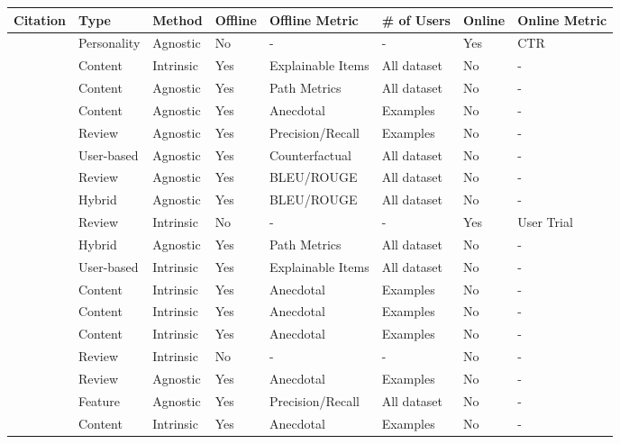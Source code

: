 \begin{tabular}{llllllll}
\toprule
Citation & Type & Method & Offline & Offline Metric & # of Users & Online & Online Metric \\
\midrule
\cite{takami_flanagan_dai_ogata_2023} & Personality & Agnostic & No & - & - & Yes & CTR \\
\cite{lin_zhang_lin_zeng_zhou_wu_2024} & Content & Intrinsic & Yes & Explainable Items & All dataset & No & - \\
\cite{zanon_da_rocha_manzato_2024} & Content & Agnostic & Yes & Path Metrics & All dataset & No & - \\
\cite{samih_ghadi_fennan_2023} & Content & Agnostic & Yes & Anecdotal & Examples & No & - \\
\cite{li_liu_zhang_kou_liu_qu_2025} & Review & Agnostic & Yes & Precision/Recall & Examples & No & - \\
\cite{wen_liu_jing_yu_2024} & User-based & Agnostic & Yes & Counterfactual & All dataset & No & - \\
\cite{long_jin_2024} & Review & Agnostic & Yes & BLEU/ROUGE & All dataset & No & - \\
\cite{jendal_le_lauw_lissandrini_dolog_hose_2024} & Hybrid & Agnostic & Yes & BLEU/ROUGE & All dataset & No & - \\
\cite{zhong_negre_2022} & Review & Intrinsic & No & - & - & Yes & User Trial \\
\cite{alizadeh_noughabi_behkamal_zarrinkalam_kahani_2024} & Hybrid & Agnostic & Yes & Path Metrics & All dataset & No & - \\
\cite{zhang_zhu_wang_2023} & User-based & Intrinsic & Yes & Explainable Items & All dataset & No & - \\
\cite{zheng_chen_cao_peng_huang_2024} & Content & Intrinsic & Yes & Anecdotal & Examples & No & - \\
\cite{wang_xie_ding_chen_xiang_2025} & Content & Intrinsic & Yes & Anecdotal & Examples & No & - \\
\cite{sang_yang_zhang_liao_2025} & Content & Intrinsic & Yes & Anecdotal & Examples & No & - \\
\cite{9811151} & Review & Intrinsic & No & - & - & No & - \\
\cite{8622439} & Review & Agnostic & Yes & Anecdotal & Examples & No & - \\
\cite{10741116} & Feature & Agnostic & Yes & Precision/Recall & All dataset & No & - \\
\cite{9607106} & Content & Intrinsic & Yes & Anecdotal & Examples & No & - \\

\end{tabular}
